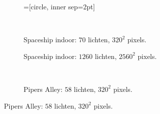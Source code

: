 \begin{figure}[t]
  \hspace{0.05\textwidth}%
  \begin{subfigure}[b]{\textwidth}
    =[circle, inner sep=2pt]
    
  \end{subfigure}\hfill\\
  \begin{adjustbox}{minipage=\textwidth, scale=0.55}
    \begin{subfigure}[b]{0.8\textwidth}
      \centering
      \def\svgwidth{\textwidth}
      
      \caption{Spaceship indoor: $70$ lichten, $320^2$ pixels.}
      \label{fig:fds-test-frames:indoor-low}
    \end{subfigure}
  \end{adjustbox}\hspace{-0.075\textwidth} %
  \begin{adjustbox}{minipage=\textwidth, scale=0.55}
    \begin{subfigure}[b]{0.8\textwidth}
      \centering
      \def\svgwidth{\textwidth}
      
      \caption{Spaceship indoor: $1260$ lichten, $2560^2$ pixels.}
      \label{fig:fds-test-frames:indoor-high}
    \end{subfigure}
  \end{adjustbox} \\
  \begin{adjustbox}{minipage=\textwidth, scale=0.55}
    \begin{subfigure}[b]{0.8\textwidth}
      \centering
      \def\svgwidth{\textwidth}
      
      \caption{Pipers Alley: $58$ lichten, $320^2$ pixels.}
      \label{fig:fds-test-frames:alley-low}
    \end{subfigure}
  \end{adjustbox}\hspace{-0.075\textwidth} %

\end{figure}
